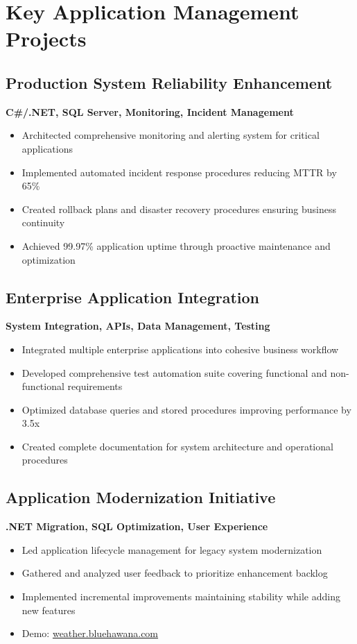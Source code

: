 \documentclass[11pt,a4paper]{article}
\begin{document}
\section*{Key Application Management Projects}

\subsection{Production System Reliability Enhancement}
\textbf{C\#/.NET, SQL Server, Monitoring, Incident Management}
\begin{itemize}[noitemsep]
  \item Architected comprehensive monitoring and alerting system for critical applications
  \item Implemented automated incident response procedures reducing MTTR by 65\%
  \item Created rollback plans and disaster recovery procedures ensuring business continuity
  \item Achieved 99.97\% application uptime through proactive maintenance and optimization
\end{itemize}

\subsection{Enterprise Application Integration}
\textbf{System Integration, APIs, Data Management, Testing}
\begin{itemize}[noitemsep]
  \item Integrated multiple enterprise applications into cohesive business workflow
  \item Developed comprehensive test automation suite covering functional and non-functional requirements
  \item Optimized database queries and stored procedures improving performance by 3.5x
  \item Created complete documentation for system architecture and operational procedures
\end{itemize}

\subsection{Application Modernization Initiative}
\textbf{.NET Migration, SQL Optimization, User Experience}
\begin{itemize}[noitemsep]
  \item Led application lifecycle management for legacy system modernization
  \item Gathered and analyzed user feedback to prioritize enhancement backlog
  \item Implemented incremental improvements maintaining stability while adding new features
  \item Demo: \href{https://weather.bluehawana.com}{weather.bluehawana.com}
\end{itemize}
\end{document}
